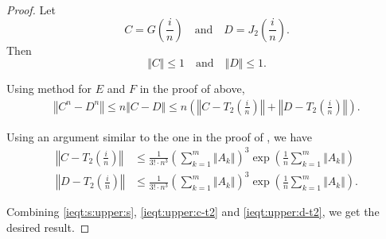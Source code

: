 \documentclass[10pt,a4paper]{amsart}
\begin{document}
\begin{proof}
	Let
\[ C=G\left(\frac{i}{n}\right)\quad \mbox{and}\quad  
		D=J_2\left(\frac{i}{n}\right).\]
Then
\[\Vert C\Vert\leq 1 \quad \mbox{and}\quad 
		\Vert D\Vert\leq 1. \]

Using method for 
 $E$ and $F$ in the proof of  above, 
	\begin{align}
	\left\Vert C^n-D^n \right\Vert 
        \leq n \Vert C-D\Vert 
		\leq n \left(\left\Vert C-T_2\left(\frac{i}{n}\right)\right\Vert +\left\Vert D-T_2\left(\frac{i}{n}\right)\right\Vert\right).\label{ieqt:s:upper:s}
	\end{align}
 
Using an argument similar to the one in the proof of , we have 
	\begin{align}
		\left\Vert C-T_2\left(\frac{i}{n}\right)\right\Vert
&\leq \frac{1}{3!\cdot n^3}\left(\sum_{k=1}^m \Vert A_k\Vert \right)^3\exp \left(\frac{1}{n}\sum_{k=1}^m \Vert A_k\Vert \right) \label{ieqt:upper:c-t2} \\
		\left\Vert D-T_2\left(\frac{i}{n}\right)\right\Vert 
		&\leq \frac{1}{3!\cdot n^3}\left(\sum_{k=1}^m \Vert A_k\Vert \right)^3\exp \left(\frac{1}{n}\sum_{k=1}^m \Vert A_k\Vert \right)  \label{ieqt:upper:d-t2}.
	\end{align}

Combining \cref{ieqt:s:upper:s}, \cref{ieqt:upper:c-t2} and \cref{ieqt:upper:d-t2}, we get the desired result. 
\end{proof}
\end{document}

